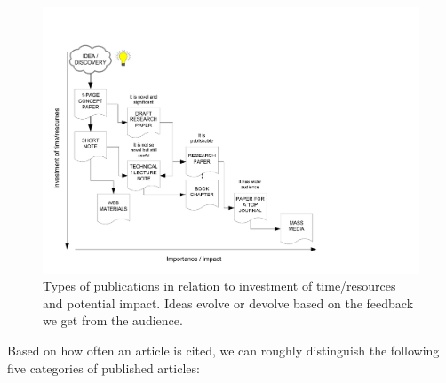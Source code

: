 \documentclass[graybox,envcountchap,sectrefs,UStrade]{svmono}
\begin{document}
\begin{figure}[htb]
\begin{center}
\includegraphics[width=.9\textwidth]{Fig_publications.pdf}
\caption{Types of publications in relation to investment of time/resources and potential impact. Ideas evolve or devolve based on the feedback we get from the audience.}
\label{F:pubs}
\end{center}
\end{figure}

Based on how often an article is cited, we can roughly distinguish the following five categories of published articles:
\end{document}
